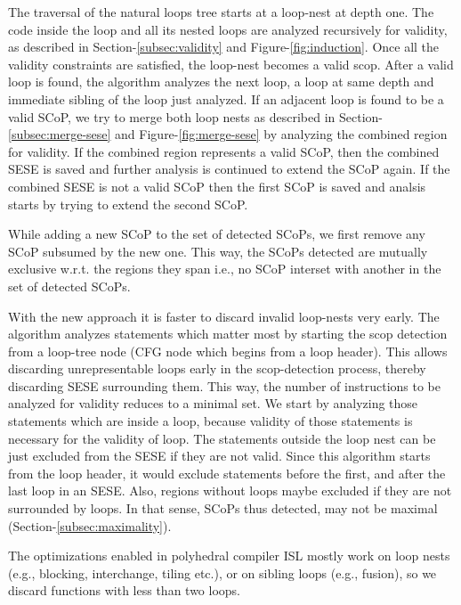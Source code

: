 \documentclass{sigplanconf}
\begin{document}
The traversal of the natural loops tree starts at a loop-nest at depth one.  The
code inside the loop and all its nested loops are analyzed recursively for
validity, as described in Section-\ref{subsec:validity} and
Figure-\ref{fig:induction}.  Once all the validity constraints are satisfied,
the loop-nest becomes a valid scop.  After a valid loop is found, the algorithm
analyzes the next loop, a loop at same depth and immediate sibling of the loop
just analyzed.  If an adjacent loop is found to be a valid SCoP, we try to merge
both loop nests as described in Section-\ref{subsec:merge-sese} and
Figure-\ref{fig:merge-sese} by analyzing the combined region for validity.  If
the combined region represents a valid SCoP, then the combined SESE is saved and
further analysis is continued to extend the SCoP again.  If the combined SESE is
not a valid SCoP then the first SCoP is saved and analsis starts by trying to
extend the second SCoP.

While adding a new SCoP to the set of detected SCoPs, we first remove any SCoP
subsumed by the new one. This way, the SCoPs detected are mutually exclusive
w.r.t. the regions they span i.e., no SCoP interset with another in the set of
detected SCoPs.

With the new approach it is faster to discard invalid loop-nests very early. The
algorithm analyzes statements which matter most by starting the scop detection
from a loop-tree node (CFG node which begins from a loop header). This allows
discarding unrepresentable loops early in the scop-detection process, thereby
discarding SESE surrounding them.  This way, the number of instructions to be
analyzed for validity reduces to a minimal set.  We start by analyzing those
statements which are inside a loop, because validity of those statements is
necessary for the validity of loop. The statements outside the loop nest can be
just excluded from the SESE if they are not valid. Since this algorithm starts
from the loop header, it would exclude statements before the first, and after
the last loop in an SESE. Also, regions without loops maybe excluded if they are
not surrounded by loops. In that sense, SCoPs thus detected, may not be maximal
(Section-\ref{subsec:maximality}).

The optimizations enabled in polyhedral compiler ISL mostly work on loop
nests (e.g., blocking, interchange, tiling etc.), or on sibling loops (e.g.,
fusion), so we discard functions with less than two loops.
\end{document}
